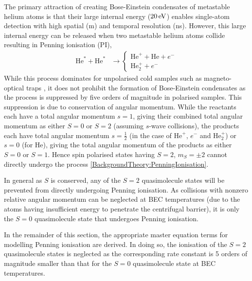 The primary attraction of creating Bose-Einstein condensates of metastable helium atoms is that their large internal energy ($\unit[20]{eV}$) enables single-atom detection with high spatial (\micro m) and temporal resolution (ns). However, this large internal energy can be released when two metastable helium atoms collide resulting in Penning ionisation (PI),
\begin{align}
    \label{BackgroundTheory:PenningIonisation}
    \text{He}^* + \text{He}^* & \rightarrow \left\{
        \begin{matrix}
            \text{He}^+ + \text{He} + e^-\\
            \text{He}_2^+ + e^-
        \end{matrix}\right.
\end{align}
While this process dominates for unpolarised cold samples such as magneto-optical traps \citep{Bardou:1992}, it does not prohibit the formation of Bose-Einstein condensates as the process is suppressed by five orders of magnitude \citep{Shlyapnikov:1994} in polarised samples.  This suppression is due to conservation of angular momentum. While the reactants each have a total angular momentum $s=1$, giving their combined total angular momentum as either $S=0$ or $S=2$ (assuming $s$-wave collisions), the products each have total angular momentum $s=\frac{1}{2}$ (in the case of $\text{He}^+$, $e^-$ and $\text{He}_2^+$) or $s=0$ (for $\text{He}$), giving the total angular momentum of the products as either $S=0$ or $S=1$. Hence spin polarised states having $S=2$, $m_S=\pm2$ cannot directly undergo the process \eqref{BackgroundTheory:PenningIonisation}.

In general as $S$ is conserved, any of the $S=2$ quasimolecule states will be prevented from directly undergoing Penning ionisation. As collisions with nonzero relative angular momentum can be neglected at BEC temperatures \citep{Venturi:2000,Stas:2006kx} (due to the atoms having insufficient energy to penetrate the centrifugal barrier), it is only the $S=0$ quasimolecule state that undergoes Penning ionisation.

In the remainder of this section, the appropriate master equation terms for modelling Penning ionisation are derived. In doing so, the ionisation of the $S=2$ quasimolecule states is neglected as the corresponding rate constant is 5 orders of magnitude smaller than that for the $S=0$ quasimolecule state at BEC temperatures.


